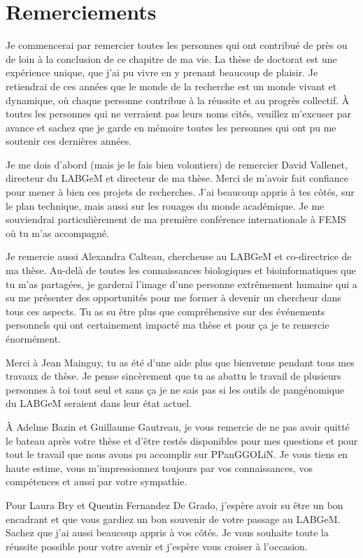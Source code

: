 \chapter*{Remerciements}

Je commencerai par remercier toutes les personnes qui ont contribué de près ou de loin à la conclusion de ce chapitre de ma vie. La thèse de doctorat est une expérience unique, que j'ai pu vivre en y prenant beaucoup de plaisir. Je retiendrai de ces années que le monde de la recherche est un monde vivant et dynamique, où chaque personne contribue à la réussite et au progrès collectif. À toutes les personnes qui ne verraient pas leurs noms cités, veuillez m'excuser par avance et sachez que je garde en mémoire toutes les personnes qui ont pu me soutenir ces dernières années.

Je me dois d'abord (mais je le fais bien volontiers) de remercier David Vallenet, directeur du LABGeM et directeur de ma thèse. Merci de m'avoir fait confiance pour mener à bien ces projets de recherches. J'ai beaucoup appris à tes côtés, sur le plan technique, mais aussi sur les rouages du monde académique. Je me souviendrai particulièrement de ma première conférence internationale à FEMS où tu m'as accompagné.

Je remercie aussi Alexandra Calteau, chercheuse au LABGeM et co-directrice de ma thèse. Au-delà de toutes les connaissances biologiques et bioinformatiques que tu m'as partagées, je garderai l'image d'une personne extrêmement humaine qui a su me présenter des opportunités pour me former à devenir un chercheur dans tous ces aspects. Tu as su être plus que compréhensive sur des événements personnels qui ont certainement impacté ma thèse et pour ça je te remercie énormément.

Merci à Jean Mainguy, tu as été d'une aide plus que bienvenue pendant tous mes travaux de thèse. Je pense sincèrement que tu as abattu le travail de plusieurs personnes à toi tout seul et sans ça je ne sais pas si les outils de pangénomique du LABGeM seraient dans leur état actuel. 

À Adelme Bazin et Guillaume Gautreau, je vous remercie de ne pas avoir quitté le bateau après votre thèse et d'être restés disponibles pour mes questions et pour tout le travail que nous avons pu accomplir sur PPanGGOLiN. Je vous tiens en haute estime, vous m'impressionnez toujours par vos connaissances, vos compétences et aussi par votre sympathie.

Pour Laura Bry et Quentin Fernandez De Grado, j'espère avoir su être un bon encadrant et que vous gardiez un bon souvenir de votre passage au LABGeM. Sachez que j'ai aussi beaucoup appris à vos côtés. Je vous souhaite toute la réussite possible pour votre avenir et j'espère vous croiser à l'occasion.

